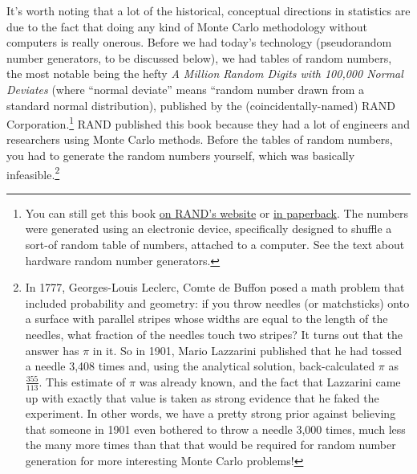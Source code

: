 \documentclass{book}
\begin{document}
It's worth noting that a lot of the historical, conceptual directions in
statistics are due to the fact that doing any kind of Monte Carlo
methodology without computers is really onerous. Before we had today's
technology (pseudorandom number generators, to be discussed below), we
had tables of random numbers, the most notable being the hefty \emph{A
Million Random Digits with 100,000 Normal Deviates} (where ``normal
deviate'' means ``random number drawn from a standard normal
distribution), published by the (coincidentally-named) RAND
Corporation.\footnote{You can still get this book
  \href{https://www.rand.org/pubs/monograph_reports/MR1418.html}{on
  RAND's website} or
  \href{https://www.amazon.com/Million-Random-Digits-Normal-Deviates/dp/0833030477/}{in
  paperback}. The numbers were generated using an electronic device,
  specifically designed to shuffle a sort-of random table of numbers,
  attached to a computer. See the text about hardware random number
  generators.} RAND published this book because they had a lot of
engineers and researchers using Monte Carlo methods. Before the tables
of random numbers, you had to generate the random numbers yourself,
which was basically infeasible.\footnote{In 1777, Georges-Louis Leclerc,
  Comte de Buffon posed a math problem that included probability and
  geometry: if you throw needles (or matchsticks) onto a surface with
  parallel stripes whose widths are equal to the length of the needles,
  what fraction of the needles touch two stripes? It turns out that the
  answer has \(\pi\) in it. So in 1901, Mario Lazzarini published that
  he had tossed a needle 3,408 times and, using the analytical solution,
  back-calculated \(\pi\) as \(\tfrac{355}{113}\). This estimate of
  \(\pi\) was already known, and the fact that Lazzarini came up with
  exactly that value is taken as strong evidence that he faked the
  experiment. In other words, we have a pretty strong prior against
  believing that someone in 1901 even bothered to throw a needle 3,000
  times, much less the many more times than that that would be required
  for random number generation for more interesting Monte Carlo
  problems!}
\end{document}
